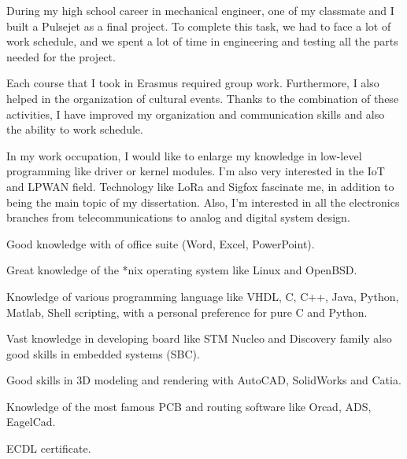 \documentclass[english,a4paper]{europasscv}
\begin{document}
\begin{europasscv}
		 {
			\begin{ecvitemize}
				\item During my high school career in mechanical engineer, one
					of my classmate and I built a Pulsejet as a final project.
					To complete this task, we had to face a lot of work schedule,
					and we spent a lot of time in engineering and testing all
					the parts needed for the project.
				\item Each course that I took in Erasmus required group work.
					Furthermore, I also helped in the organization of cultural
					events. Thanks to the combination of these activities, I
					have improved my organization and communication skills and
					also the ability to work schedule.
			\end{ecvitemize}
		}

		 {
			\begin{ecvitemize}
				\item In my work occupation, I would like to enlarge my
				knowledge in low-level programming like driver or kernel modules.
				I'm also very interested in the IoT and LPWAN field.
				Technology like LoRa and Sigfox fascinate me, in addition to
				being the main topic of my dissertation.  Also, I'm interested
				in all the electronics branches from telecommunications to
				analog and digital system design.
			\end{ecvitemize}}

		 {
			\begin{ecvitemize}
				\item Good knowledge with of office suite (Word, Excel,
					PowerPoint).
				\item Great knowledge of the *nix operating system like Linux
					and OpenBSD.
				\item Knowledge of various programming language like VHDL, C,
					C++, Java, Python, Matlab, Shell
					scripting, with a personal preference for pure C and Python.
				\item Vast knowledge in developing board like STM Nucleo and
					Discovery family also good skills in embedded systems (SBC).
				\item Good skills in 3D modeling and rendering with AutoCAD,
					SolidWorks and Catia.
				\item Knowledge of the most famous PCB and routing software like
					Orcad, ADS, EagelCad.
				\item ECDL certificate.
			\end{ecvitemize}
		}


\end{europasscv}
\end{document}
